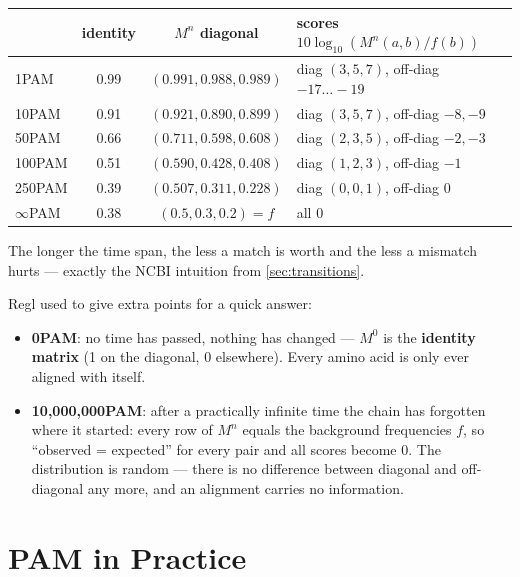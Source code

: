 \documentclass[11pt, oneside]{book}
\let\originalsection\section
\renewcommand{\section}{\Needspace{7\baselineskip}\originalsection}
\begin{document}
\begin{exbox}[title={The three-letter example over time}]
\small
\centering
\begin{tabular}{@{}lccl@{}}
\toprule
 & identity & $M^n$ diagonal & scores $10\log_{10}(M^n(a,b)/f(b))$ \\
\midrule
1PAM   & 0.99  & $(0.991, 0.988, 0.989)$ & diag $(3,5,7)$, off-diag $-17 \ldots -19$ \\
10PAM  & 0.91  & $(0.921, 0.890, 0.899)$ & diag $(3,5,7)$, off-diag $-8, -9$ \\
50PAM  & 0.66  & $(0.711, 0.598, 0.608)$ & diag $(2,3,5)$, off-diag $-2, -3$ \\
100PAM & 0.51  & $(0.590, 0.428, 0.408)$ & diag $(1,2,3)$, off-diag $-1$ \\
250PAM & 0.39  & $(0.507, 0.311, 0.228)$ & diag $(0,0,1)$, off-diag $0$ \\
$\infty$PAM & 0.38 & $(0.5, 0.3, 0.2) = f$ & all $0$ \\
\bottomrule
\end{tabular}

\raggedright
\medskip
The longer the time span, the less a match is worth and the less a mismatch
hurts --- exactly the NCBI intuition from \cref{sec:transitions}.
\end{exbox}

\begin{notebox}[title={Exam-style question: what does 0PAM look like? And 10,000,000PAM}]
Regl used to give extra points for a quick answer:
\begin{itemize}
  \item \textbf{0PAM}: no time has passed, nothing has changed --- $M^0$ is the
    \textbf{identity matrix} (1 on the diagonal, 0 elsewhere). Every amino
    acid is only ever aligned with itself.
  \item \textbf{10,000,000PAM}: after a practically infinite time the chain has
    forgotten where it started: every row of $M^n$ equals the background
    frequencies $f$, so ``observed = expected'' for every pair and all scores
    become 0. The distribution is random --- there is no difference between
    diagonal and off-diagonal any more, and an alignment carries no
    information.
\end{itemize}
\end{notebox}

\section{PAM in Practice}
\end{document}
